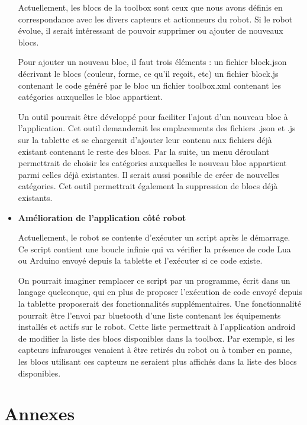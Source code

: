 \documentclass[12pt,francais]{report}
\begin{document}
\begin{itemize}
Actuellement, les blocs de la toolbox sont ceux que nous avons définis en correspondance avec les divers capteurs et actionneurs du robot. Si le robot évolue, il serait intéressant de pouvoir supprimer ou ajouter de nouveaux blocs. 

Pour ajouter un nouveau bloc, il faut trois éléments :
un fichier block.json décrivant le blocs (couleur, forme, ce qu'il reçoit, etc)
un fichier block.js contenant le code généré par le bloc
un fichier toolbox.xml contenant les catégories auxquelles le bloc appartient.

Un outil pourrait être développé pour faciliter l'ajout d'un nouveau bloc à l'application. Cet outil demanderait les emplacements des fichiers .json et .js sur la tablette et se chargerait d'ajouter leur contenu aux fichiers déjà existant contenant le reste des blocs. Par la suite, un menu déroulant permettrait de choisir les catégories auxquelles le nouveau bloc appartient parmi celles déjà existantes. Il serait aussi possible de créer de nouvelles catégories. Cet outil permettrait également la suppression de blocs déjà existants.

\bigskip
\item \textbf{Amélioration de l'application côté robot}

Actuellement, le robot se contente d'exécuter un script après le démarrage. Ce script contient une boucle infinie qui va vérifier la présence de code Lua ou Arduino envoyé depuis la tablette et l'exécuter si ce code existe.

On pourrait imaginer remplacer ce script par un programme, écrit dans un langage quelconque, qui en plus de proposer l'exécution de code envoyé depuis la tablette proposerait des fonctionnalités supplémentaires. Une fonctionnalité pourrait être l'envoi par bluetooth d'une liste contenant les équipements installés et actifs sur le robot. Cette liste permettrait à l'application android de modifier la liste des blocs disponibles dans la toolbox. Par exemple, si les capteurs infrarouges venaient à être retirés du robot ou à tomber en panne, les blocs utilisant ces capteurs ne seraient plus affichés dans la liste des blocs disponibles.

\end{itemize}






\chapter*{Annexes}
\end{document}
